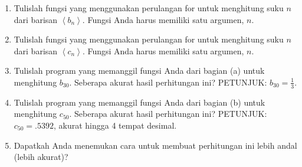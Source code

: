 \begin{enumerate}
\begin{enumerate}
\item Tulislah fungsi yang menggunakan perulangan for untuk menghitung suku
$n$ dari barisan $\left\langle b_{n}\right\rangle $. Fungsi Anda
harus memiliki satu argumen, $n$.
\item Tulislah fungsi yang menggunakan perulangan for untuk menghitung suku
$n$ dari barisan $\left\langle c_{n}\right\rangle $. Fungsi Anda
harus memiliki satu argumen, $n$.
\item Tulislah program yang memanggil fungsi Anda dari bagian (a) untuk
menghitung $b_{30}$. Seberapa akurat hasil perhitungan ini? PETUNJUK:
$b_{30}=\frac{1}{3}$. 
\item Tulislah program yang memanggil fungsi Anda dari bagian (b) untuk
menghitung $c_{50}$. Seberapa akurat hasil perhitungan ini? PETUNJUK:
$c_{50}=.5392$, akurat hingga 4 tempat desimal.
\item Dapatkah Anda menemukan cara untuk membuat perhitungan ini lebih andal
(lebih akurat)?
\end{enumerate}
\end{enumerate}
\finishexercises 
